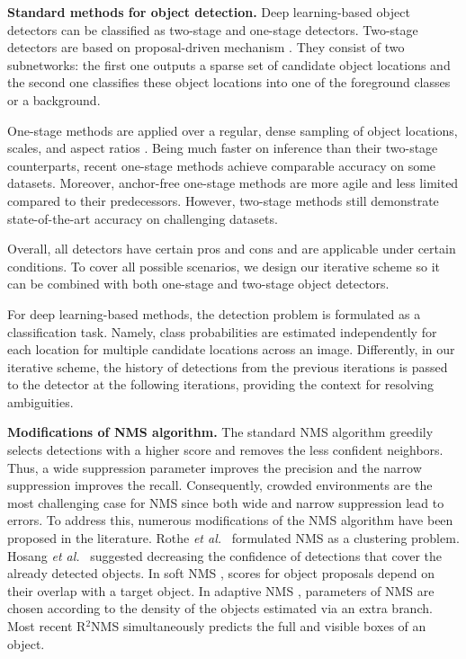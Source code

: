 \documentclass[runningheads]{llncs}
\newcommand{\etal}{\emph{et al.}\ }
\begin{document}
\textbf{Standard methods for object detection.}
Deep learning-based object detectors can be classified as two-stage and one-stage detectors. Two-stage detectors are based on proposal-driven mechanism \cite{girshick2015fast,ren2015faster}. They consist of two subnetworks: the first one outputs a sparse set of candidate object locations and the second one classifies these object locations into one of the foreground classes or a background. 

One-stage methods are applied over a regular, dense sampling of object locations, scales, and aspect ratios \cite{liu2016ssd,lin2017focal}. Being much faster on inference than their two-stage counterparts, recent one-stage methods achieve comparable accuracy on some datasets. Moreover, anchor-free one-stage methods \cite{tian2019fcos} are more agile and less limited compared to their predecessors. However, two-stage methods still demonstrate state-of-the-art accuracy on challenging datasets.

Overall, all detectors have certain pros and cons and are applicable under certain conditions. To cover all possible scenarios, we design our iterative scheme so it can be combined with both one-stage and two-stage object detectors.

For deep learning-based methods, the detection problem is formulated as a classification task. Namely, class probabilities are estimated independently for each location for multiple candidate locations across an image. Differently, in our iterative scheme, the history of detections from the previous iterations is passed to the detector at the following iterations, providing the context for resolving ambiguities.

\textbf{Modifications of NMS algorithm.}
The standard NMS algorithm greedily selects detections with a higher score and removes the less confident neighbors. Thus, a wide suppression parameter improves the precision and the narrow suppression improves the recall. Consequently, crowded environments are the most challenging case for NMS since both wide and narrow suppression lead to errors. To address this, numerous modifications of the NMS algorithm have been proposed in the literature. Rothe \etal \cite{rothe2014non} formulated NMS as a clustering problem. Hosang \etal \cite{hosang2017learning} suggested decreasing the confidence of detections that cover the already detected objects. In soft NMS \cite{bodla2017soft}, scores for object proposals depend on their overlap with a target object. In adaptive NMS \cite{liu2019adaptive}, parameters of NMS are chosen according to the density of the objects estimated via an extra branch. Most recent R$^2$NMS \cite{huang2020nms} simultaneously predicts the full and visible boxes of an object. 
\end{document}
